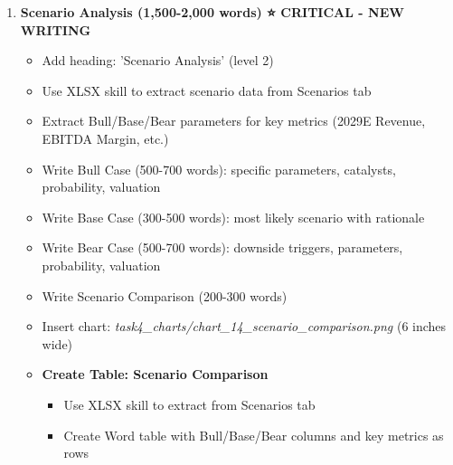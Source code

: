 \documentclass[11pt]{article}
\begin{document}
\begin{enumerate}[leftmargin=*,itemsep=2pt,topsep=2pt]
\begin{itemize}[leftmargin=*,itemsep=2pt,topsep=2pt]
\item {} Use XLSX skill to read Scenarios tab to inform assumptions
\item {} Use XLSX skill to read Revenue Model tab for specific product/geography projections
\item {} Add heading: 'Revenue Assumptions by Product' (level 3)
\item {} Write detailed product-by-product assumptions (8-12 points per major product)
\item {} Write detailed region-by-region assumptions (6-8 points per major region)
\item {} Include margin, opex, capex, working capital assumptions
\item {} \textbf{Total: 2,000-3,000 words of specific, quantified assumptions}
\end{itemize}
\item {} \textbf{Scenario Analysis (1,500-2,000 words) ⭐ CRITICAL - NEW WRITING}
\begin{itemize}[leftmargin=*,itemsep=2pt,topsep=2pt]
\item {} Add heading: 'Scenario Analysis' (level 2)
\item {} Use XLSX skill to extract scenario data from Scenarios tab
\item {} Extract Bull/Base/Bear parameters for key metrics (2029E Revenue, EBITDA Margin, etc.)
\item {} Write Bull Case (500-700 words): specific parameters, catalysts, probability, valuation
\item {} Write Base Case (300-500 words): most likely scenario with rationale
\item {} Write Bear Case (500-700 words): downside triggers, parameters, probability, valuation
\item {} Write Scenario Comparison (200-300 words)
\item {} Insert chart: \emph{task4\_\allowbreak{}charts/chart\_\allowbreak{}14\_\allowbreak{}scenario\_\allowbreak{}comparison.png} (6 inches wide)
\item {} \textbf{Create Table: Scenario Comparison}
\begin{itemize}[leftmargin=*,itemsep=2pt,topsep=2pt]
\item {} Use XLSX skill to extract from Scenarios tab
\item {} Create Word table with Bull/Base/Bear columns and key metrics as rows
\end{itemize}
\end{itemize}

\end{enumerate}
\end{document}
